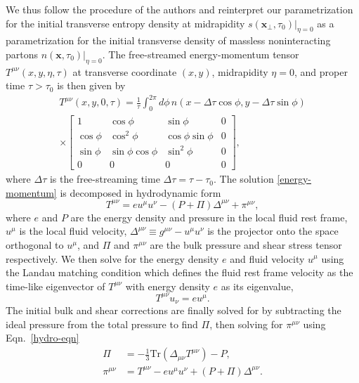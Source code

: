 \documentclass[aps,prc,reprint,amsmath,nofootinbib]{revtex4-1}
\begin{document}
We thus follow the procedure of the authors and reinterpret our parametrization for the initial transverse entropy density at midrapidity $s(\mathbf{x_\perp}, \tau_0)\vert_{\eta=0}$ as a parametrization for the initial transverse density of massless noninteracting partons $n(\mathbf{x}, \tau_0)\vert_{\eta=0}$.
The free-streamed energy-momentum tensor $T^{\mu\nu}(x, y, \eta, \tau)$ at transverse coordinate $(x, y)$, midrapidity $\eta=0$, and proper time $\tau > \tau_0$ is then given by
\begin{multline}
  \label{energy-momentum}
  T^{\mu\nu}(x, y, 0, \tau) = \frac{1}{\tau} \int_{0}^{2\pi} d\phi\, n(x - \Delta \tau \cos \phi, y - \Delta \tau \sin \phi) \\ \times
  \begin{bmatrix}
    1 & \cos\phi & \sin\phi  & 0\\
    \cos\phi & \cos^2\phi & \cos\phi\sin\phi & 0 \\
    \sin\phi & \sin\phi \cos\phi & \sin^2\phi & 0\\
    0 & 0 & 0 & 0
  \end{bmatrix},
\end{multline}
where $\Delta\tau$ is the free-streaming time $\Delta\tau = \tau - \tau_0$.
The solution \eqref{energy-momentum} is decomposed in hydrodynamic form
\begin{equation}
  \label{hydro-eqn}
  T^{\mu\nu} = e u^\mu u^\nu - (P + \Pi) \Delta^{\mu\nu} + \pi^{\mu\nu},
\end{equation}
where $e$ and $P$ are the energy density and pressure in the local fluid rest frame, $u^\mu$ is the local fluid velocity, ${\Delta^{\mu\nu} \equiv g^{\mu\nu} - u^\mu u^\nu}$ is the projector onto the space orthogonal to $u^\mu$, and $\Pi$ and $\pi^{\mu\nu}$ are the bulk pressure and shear stress tensor respectively.
We then solve for the energy density $e$ and fluid velocity $u^\mu$ using the Landau matching condition which defines the fluid rest frame velocity as the time-like eigenvector of $T^{\mu\nu}$ with energy density $e$ as its eigenvalue,
\begin{equation}
  T^{\mu\nu} u_\nu = e u^\mu.
\end{equation}
The initial bulk and shear corrections are finally solved for by subtracting the ideal pressure from the total pressure to find $\Pi$, then solving for $\pi^{\mu\nu}$ using Eqn.~\eqref{hydro-eqn}
\begin{align}
  \Pi &= -\frac{1}{3} \mathrm{Tr}(\Delta_{\mu\nu} T^{\mu\nu}) - P,\\
  \pi^{\mu\nu} &= T^{\mu\nu} - e u^\mu u^\nu + (P + \Pi) \Delta^{\mu\nu}.
\end{align}
\end{document}
